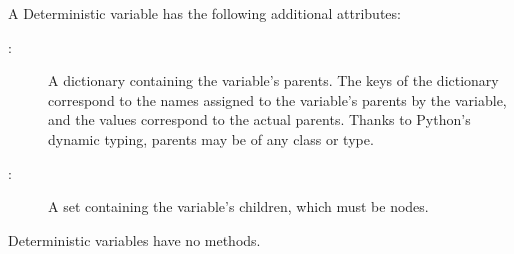 A Deterministic variable has the following additional attributes:
\begin{description}
    \item[:] A dictionary containing the variable's parents. The keys of the dictionary correspond to the names assigned to the variable's parents by the variable, and the values correspond to the actual parents. Thanks to Python's dynamic typing, parents may be of any class or type.
    \item[:] A set containing the variable's children, which must be nodes.
\end{description}
Deterministic variables have no methods.


